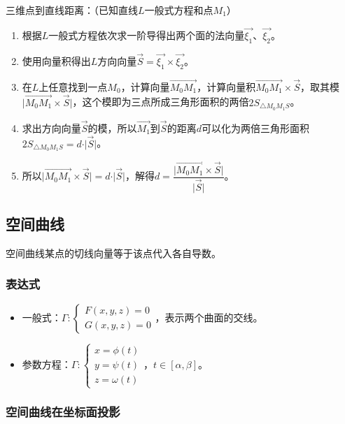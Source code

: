 \documentclass[UTF8, 12pt]{ctexart}
\begin{document}
三维点到直线距离：（已知直线$L$一般式方程和点$M_1$）

\begin{enumerate}
    \item 根据$L$一般式方程依次求一阶导得出两个面的法向量$\vec{\xi_1}$、$\vec{\xi_2}$。
    \item 使用向量积得出$L$方向向量$\vec{S}=\vec{\xi_1}\times\vec{\xi_2}$。
    \item 在$L$上任意找到一点$M_0$，计算向量$\overrightarrow{M_0M_1}$，计算向量积$\overrightarrow{M_0M_1}\times\vec{S}$，取其模$\vert\overrightarrow{M_0M_1}\times\vec{S}\vert$，这个模即为三点所成三角形面积的两倍$2S_{\triangle M_0M_1S}$。
    \item 求出方向向量$\vec{S}$的模，所以$\vec{M_1}$到$\vec{S}$的距离$d$可以化为两倍三角形面积$2S_{\triangle M_0M_1S}=d\cdot\vert\vec{S}\vert$。
    \item 所以$\vert\overrightarrow{M_0M_1}\times\vec{S}\vert=d\cdot\vert\vec{S}\vert$，解得$d=\dfrac{\vert\overrightarrow{M_0M_1}\times\vec{S}\vert}{\vert\vec{S}\vert}$。
\end{enumerate}

\subsection{空间曲线}

空间曲线某点的切线向量等于该点代入各自导数。

\subsubsection{表达式}

\begin{itemize}
    \item 一般式：$\varGamma:\left\{\begin{array}{l}
        F(x,y,z)=0 \\
        G(x,y,z)=0
    \end{array}\right.$，表示两个曲面的交线。
    \item 参数方程：$\varGamma:\left\{\begin{array}{l}
        x=\phi(t) \\
        y=\psi(t) \\
        z=\omega(t)
    \end{array}\right.$，$t\in[\alpha,\beta]$。
\end{itemize}

\subsubsection{空间曲线在坐标面投影}
\end{document}
